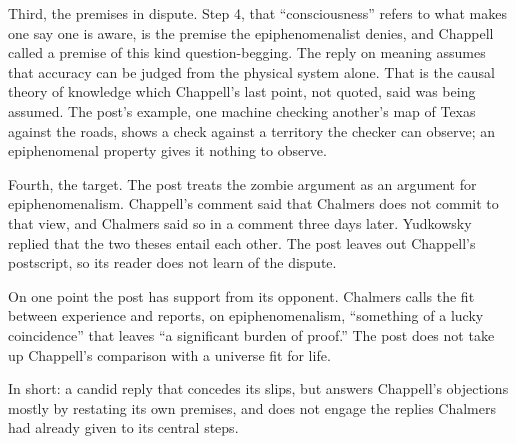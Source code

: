 \begin{afterword}
Third, the premises in dispute. Step 4, that ``consciousness'' refers to what makes one say one is aware, is the premise the epiphenomenalist denies, and Chappell called a premise of this kind question-begging. The reply on meaning assumes that accuracy can be judged from the physical system alone. That is the causal theory of knowledge which Chappell's last point, not quoted, said was being assumed. The post's example, one machine checking another's map of Texas against the roads, shows a check against a territory the checker can observe; an epiphenomenal property gives it nothing to observe.

Fourth, the target. The post treats the zombie argument as an argument for epiphenomenalism. Chappell's comment said that Chalmers does not commit to that view, and Chalmers said so in a comment three days later. Yudkowsky replied that the two theses entail each other. The post leaves out Chappell's postscript, so its reader does not learn of the dispute.

On one point the post has support from its opponent. Chalmers calls the fit between experience and reports, on epiphenomenalism, ``something of a lucky coincidence'' that leaves ``a significant burden of proof.'' The post does not take up Chappell's comparison with a universe fit for life.

In short: a candid reply that concedes its slips, but answers Chappell's objections mostly by restating its own premises, and does not engage the replies Chalmers had already given to its central steps.
\end{afterword}
